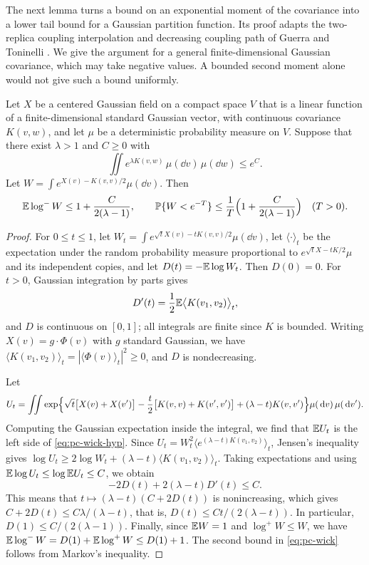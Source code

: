 The next lemma turns a bound on an exponential moment of the covariance into a lower tail bound for a Gaussian partition function. Its proof adapts the two-replica coupling interpolation and decreasing coupling path of Guerra and Toninelli \cite[Section~3, (19)--(26)]{GuerraToninelli2002}. We give the argument for a general finite-dimensional Gaussian covariance, which may take negative values. A bounded second moment alone would not give such a bound uniformly.

\begin{lemma}\label{lem:pc-wick}
Let $X$ be a centered Gaussian field on a compact space $V$ that is a linear function of a finite-dimensional standard Gaussian vector, with continuous covariance $K(v,w)$, and let $\mu$ be a deterministic probability measure on $V$. Suppose that there exist $\lambda>1$ and $C\ge0$ with
\begin{equation}\label{eq:pc-wick-hyp}
\iint e^{\lambda K(v,w)}\,\mu(\dd v)\,\mu(\dd w)\le e^C.
\end{equation}
Let $W=\int e^{X(v)-K(v,v)/2}\mu(\dd v)$. Then
\begin{equation}\label{eq:pc-wick}
\mathbb E\log^-W\le1+\frac C{2(\lambda-1)},\qquad\mathbb P\{W<e^{-T}\}\le\frac1T\Bigl(1+\frac C{2(\lambda-1)}\Bigr)\quad(T>0).
\end{equation}
\end{lemma}

\begin{proof}
For $0\le t\le1$, let $W_t=\int e^{\sqrt tX(v)-tK(v,v)/2}\mu(\dd v)$, let $\langle\cdot\rangle_t$ be the expectation under the random probability measure proportional to $e^{\sqrt tX-tK/2}\mu$ and its independent copies, and let $D(t)=-\mathbb E\log W_t$. Then $D(0)=0$. For $t>0$, Gaussian integration by parts gives
\[
D'(t)=\frac12\mathbb E\bigl\langle K(v_1,v_2)\bigr\rangle_t,
\]
and $D$ is continuous on $[0,1]$; all integrals are finite since $K$ is bounded. Writing $X(v)=g\cdot\Phi(v)$ with $g$ standard Gaussian, we have $\langle K(v_1,v_2)\rangle_t=|\langle\Phi(v)\rangle_t|^2\ge0$, and $D$ is nondecreasing.

Let
\[
U_t=\iint\exp\Bigl\{\sqrt t\bigl[X(v)+X(v')\bigr]-\frac t2\bigl[K(v,v)+K(v',v')\bigr]+(\lambda-t)K(v,v')\Bigr\}\mu(\,\mathrm d v)\,\mu(\,\mathrm d v').
\]
Computing the Gaussian expectation inside the integral, we find that $\mathbb E U_t$ is the left side of \eqref{eq:pc-wick-hyp}. Since $U_t=W_t^2\langle e^{(\lambda-t)K(v_1,v_2)}\rangle_t$, Jensen's inequality gives $\log U_t\ge2\log W_t+(\lambda-t)\langle K(v_1,v_2)\rangle_t$. Taking expectations and using $\mathbb E\log U_t\le\log\mathbb E U_t\le C$, we obtain
\[
-2D(t)+2(\lambda-t)D'(t)\le C.
\]
This means that $t\mapsto(\lambda-t)(C+2D(t))$ is nonincreasing, which gives $C+2D(t)\le C\lambda/(\lambda-t)$, that is, $D(t)\le Ct/(2(\lambda-t))$. In particular, $D(1)\le C/(2(\lambda-1))$. Finally, since $\mathbb E W=1$ and $\log^+W\le W$, we have $\mathbb E\log^-W=D(1)+\mathbb E\log^+W\le D(1)+1$. The second bound in \eqref{eq:pc-wick} follows from Markov's inequality.
\end{proof}

